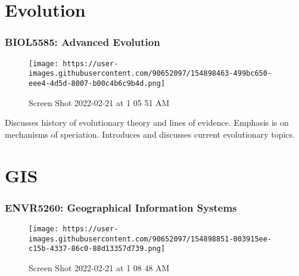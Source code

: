 \documentclass[
  letterpaper,
  DIV=11,
  numbers=noendperiod]{scrreprt}
\begin{document}
\hypertarget{evolution}{%
\section*{\texorpdfstring{\textbf{Evolution}}{Evolution}}\label{evolution}}


\hypertarget{biol5585-advanced-evolution}{%
\subsubsection*{\texorpdfstring{\textbf{BIOL5585: Advanced
Evolution}}{BIOL5585: Advanced Evolution}}\label{biol5585-advanced-evolution}}

\begin{figure}

{\centering \texttt{[image: https://user-images.githubusercontent.com/90652097/154898463-499bc650-eee4-4d5d-8007-b00c4b6c9b4d.png]}

}

\caption{Screen Shot 2022-02-21 at 1 05 51 AM}

\end{figure}

Discusses history of evolutionary theory and lines of evidence. Emphasis
is on mechanisms of speciation. Introduces and discusses current
evolutionary topics.

\hypertarget{gis}{%
\section*{\texorpdfstring{\textbf{GIS}}{GIS}}\label{gis}}


\hypertarget{envr5260-geographical-information-systems}{%
\subsubsection*{\texorpdfstring{\textbf{ENVR5260: Geographical
Information
Systems}}{ENVR5260: Geographical Information Systems}}\label{envr5260-geographical-information-systems}}

\begin{figure}

{\centering \texttt{[image: https://user-images.githubusercontent.com/90652097/154898851-003915ee-c15b-4337-86c0-88d13357d739.png]}

}

\caption{Screen Shot 2022-02-21 at 1 08 48 AM}

\end{figure}
\end{document}
